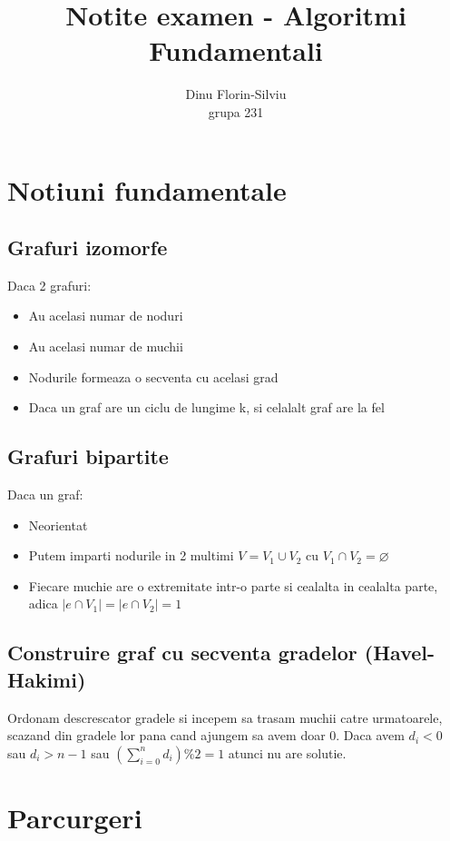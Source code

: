 \documentclass{article}
\title{Notite examen - Algoritmi Fundamentali}
\date{}
\author{Dinu Florin-Silviu \\ grupa 231}
\begin{document}
    \maketitle
    \tableofcontents

    \newpage

    \section{Notiuni fundamentale}
    \subsection*{Grafuri izomorfe} Daca 2 grafuri:
    \begin{itemize}
        \item Au acelasi numar de noduri
        \item Au acelasi numar de muchii
        \item Nodurile formeaza o secventa cu acelasi grad
        \item Daca un graf are un ciclu de lungime k, si celalalt graf are la fel
    \end{itemize} 

    \subsection*{Grafuri bipartite} Daca un graf:
    \begin{itemize}
        \item Neorientat
        \item Putem imparti nodurile in 2 multimi $V=V_1 \cup V_2$ cu $V_1 \cap V_2 = \varnothing$
        \item Fiecare muchie are o extremitate intr-o parte si cealalta in cealalta parte, adica $|e \cap V_1| = |e \cap V_2| = 1$
    \end{itemize}

    \subsection*{Construire graf cu secventa gradelor (Havel-Hakimi)} Ordonam descrescator gradele si incepem sa trasam muchii catre urmatoarele, scazand din gradele lor pana cand ajungem sa avem doar 0. Daca avem $d_i<0$ sau $d_i>n-1$ sau $(\sum_{i=0}^{n} d_i) \% 2 = 1$ atunci nu are solutie.

    \section{Parcurgeri}
\end{document}
